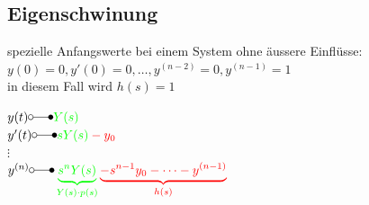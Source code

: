 	\subsection{Eigenschwinung}
		spezielle Anfangswerte bei einem System ohne äussere Einflüsse: $y(0) = 0, y'(0) = 0, \dots , y^{(n-2)} = 0, y^{(n-1)} = 1$\\
		in diesem Fall wird $h(s) = 1$\\
		\begin{minipage}[l]{16cm}
			$y(t) \laplace \color{green} Y(s)$\\
			$y'(t) \laplace \color{green} sY(s)\color{red} - y_0$\\
			$\vdots$\\
			$y^{(n)} \laplace 
			\color{green}\underbrace{s^nY(s)}_{Y(s) \cdot p(s)}
			\color{red}\underbrace{-s^{n-1}y_0 - \dots - y^{(n-1)}}_{h(s)}$
		\end{minipage}